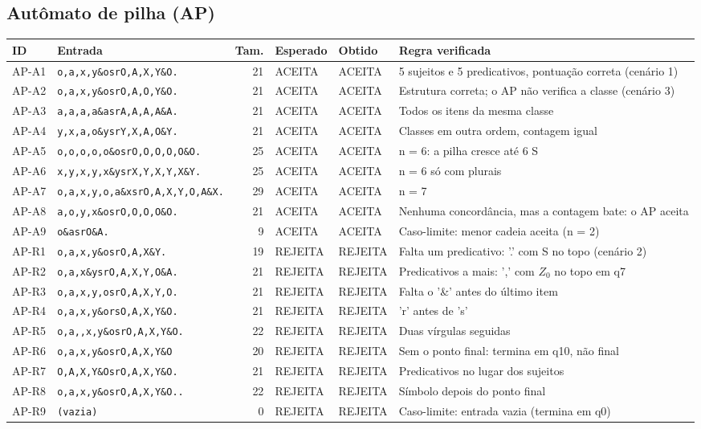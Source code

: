 \subsection*{Autômato de pilha (AP)}
\begin{longtable}{l p{5.2cm} r l l p{5cm}}
\textbf{ID} & \textbf{Entrada} & \textbf{Tam.} & \textbf{Esperado} & \textbf{Obtido} & \textbf{Regra verificada} \\ \hline \endhead
AP-A1 & \texttt{o,a,x,y\&osrO,A,X,Y\&O.} & 21 & ACEITA & ACEITA & 5 sujeitos e 5 predicativos, pontuação correta (cenário 1) \\
AP-A2 & \texttt{o,a,x,y\&osrO,A,O,Y\&O.} & 21 & ACEITA & ACEITA & Estrutura correta; o AP não verifica a classe (cenário 3) \\
AP-A3 & \texttt{a,a,a,a\&asrA,A,A,A\&A.} & 21 & ACEITA & ACEITA & Todos os itens da mesma classe \\
AP-A4 & \texttt{y,x,a,o\&ysrY,X,A,O\&Y.} & 21 & ACEITA & ACEITA & Classes em outra ordem, contagem igual \\
AP-A5 & \texttt{o,o,o,o,o\&osrO,O,O,O,O\&O.} & 25 & ACEITA & ACEITA & n = 6: a pilha cresce até 6 S \\
AP-A6 & \texttt{x,y,x,y,x\&ysrX,Y,X,Y,X\&Y.} & 25 & ACEITA & ACEITA & n = 6 só com plurais \\
AP-A7 & \texttt{o,a,x,y,o,a\&xsrO,A,X,Y,O,A\&X.} & 29 & ACEITA & ACEITA & n = 7 \\
AP-A8 & \texttt{a,o,y,x\&osrO,O,O,O\&O.} & 21 & ACEITA & ACEITA & Nenhuma concordância, mas a contagem bate: o AP aceita \\
AP-A9 & \texttt{o\&asrO\&A.} & 9 & ACEITA & ACEITA & Caso-limite: menor cadeia aceita (n = 2) \\
AP-R1 & \texttt{o,a,x,y\&osrO,A,X\&Y.} & 19 & REJEITA & REJEITA & Falta um predicativo: '.' com S no topo (cenário 2) \\
AP-R2 & \texttt{o,a,x\&ysrO,A,X,Y,O\&A.} & 21 & REJEITA & REJEITA & Predicativos a mais: ',' com $Z_0$ no topo em q7 \\
AP-R3 & \texttt{o,a,x,y,osrO,A,X,Y,O.} & 21 & REJEITA & REJEITA & Falta o '\&' antes do último item \\
AP-R4 & \texttt{o,a,x,y\&orsO,A,X,Y\&O.} & 21 & REJEITA & REJEITA & 'r' antes de 's' \\
AP-R5 & \texttt{o,a,,x,y\&osrO,A,X,Y\&O.} & 22 & REJEITA & REJEITA & Duas vírgulas seguidas \\
AP-R6 & \texttt{o,a,x,y\&osrO,A,X,Y\&O} & 20 & REJEITA & REJEITA & Sem o ponto final: termina em q10, não final \\
AP-R7 & \texttt{O,A,X,Y\&OsrO,A,X,Y\&O.} & 21 & REJEITA & REJEITA & Predicativos no lugar dos sujeitos \\
AP-R8 & \texttt{o,a,x,y\&osrO,A,X,Y\&O..} & 22 & REJEITA & REJEITA & Símbolo depois do ponto final \\
AP-R9 & \texttt{(vazia)} & 0 & REJEITA & REJEITA & Caso-limite: entrada vazia (termina em q0) \\
\end{longtable}
